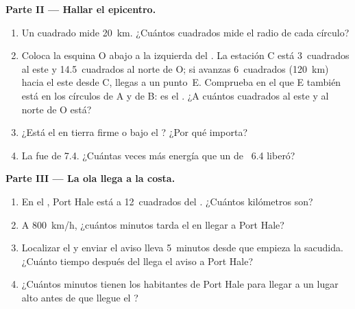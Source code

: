 \begin{problem}
\medskip
\noindent\textbf{Parte II --- Hallar el epicentro.}\par\nopagebreak
\begin{enumerate}[resume, beginpenalty=10000]
  \item Un cuadrado mide \qty{20}{km}. ¿Cuántos cuadrados mide el radio de
        cada círculo?
  \item Coloca la esquina O abajo a la izquierda del . La estación C
        está 3~cuadrados al este y 14.5~cuadrados al norte de O; si avanzas
        6~cuadrados (\qty{120}{km}) hacia el este desde C, llegas a un
        punto~E. Comprueba en el  que E también está en los círculos de
        A y de B: es el . ¿A cuántos cuadrados al este y al norte
        de O está?
  \item ¿Está el  en tierra firme o bajo el ? ¿Por qué importa?
  \item La  fue de 7.4. ¿Cuántas veces más energía que un 
        de ~6.4 liberó?
\end{enumerate}

\medskip
\noindent\textbf{Parte III --- La ola llega a la costa.}\par\nopagebreak
\begin{enumerate}[resume, beginpenalty=10000]
  \item En el , Port Hale está a 12~cuadrados del . ¿Cuántos
        kilómetros son?
  \item A \qty{800}{km/h}, ¿cuántos minutos tarda el  en llegar a
        Port Hale?
  \item Localizar el  y enviar el aviso lleva 5~minutos desde que
        empieza la sacudida. ¿Cuánto tiempo después del  llega el
        aviso a Port Hale?
  \item ¿Cuántos minutos tienen los habitantes de Port Hale para llegar a
        un lugar alto antes de que llegue el ?
\end{enumerate}
\end{problem}
